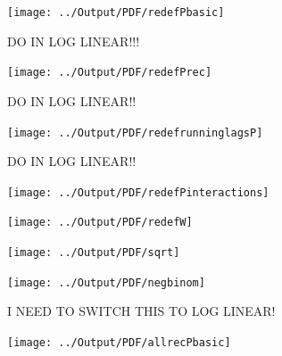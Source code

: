 \documentclass[12pt] {article}
\begin{document}
\pagebreak{}
\begin{table}
\caption{}
\label{Flo:Poisson Basic}\texttt{[image: ../Output/PDF/redefPbasic]}
\end{table}

\clearpage{}
\pagebreak{}
\begin{table}
\caption{DO IN LOG LINEAR!!!}
\label{Flo:Poisson Rec&Mort}\texttt{[image: ../Output/PDF/redefPrec]}
\end{table}


\clearpage{}
\pagebreak{}
\begin{table}
\caption{DO IN LOG LINEAR!!}
\label{Flo:Cumulative LagsP}\texttt{[image: ../Output/PDF/redefrunninglagsP]}
\end{table}

\clearpage{}
\pagebreak{}
\begin{table}
\caption{DO IN LOG LINEAR!!}
\label{Flo:Poisson Interactions}\texttt{[image: ../Output/PDF/redefPinteractions]}
\end{table}

\pagebreak{}
\begin{table}
\caption{}
\label{Flo:County-basic}\texttt{[image: ../Output/PDF/redefW]}
\end{table}


\pagebreak{}
\clearpage{}
\begin{table}
\caption{}
\label{Flo:sqrt}
\texttt{[image: ../Output/PDF/sqrt]}
\end{table}

\pagebreak{}
\clearpage{}
\begin{table}
\caption{}
\label{Flo:negbinom}
\texttt{[image: ../Output/PDF/negbinom]}
\end{table}

\pagebreak{}
\clearpage{}
\begin{table}
\caption{I NEED TO SWITCH THIS TO LOG LINEAR!}
\label{Flo:allrecruits}
\texttt{[image: ../Output/PDF/allrecPbasic]}
\end{table}
\end{document}
